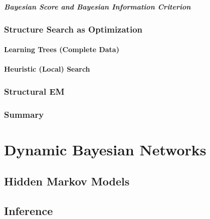 				\paragraph{Bayesian Score and Bayesian Information Criterion} %

		\subsection{Structure Search as Optimization} %

			\subsubsection{Learning Trees (Complete Data)} %

			\subsubsection{Heuristic (Local) Search} %

		\subsection{Structural EM} %

		\subsection{Summary} %

\chapter{Dynamic Bayesian Networks} %

	\section{Hidden Markov Models} %

	\section{Inference} %

